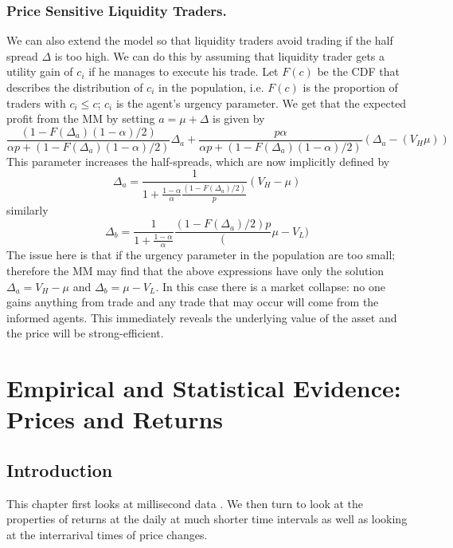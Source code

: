 \documentclass[11pt,a4paper]{article}
\theoremstyle{definition}
\theoremstyle{plain}
\theoremstyle{remark}
\newcommand{\1}{\mathbbm{1}}
\begin{document}
\subsubsection{Price Sensitive Liquidity Traders.} 
We can also extend the model so that liquidity traders avoid trading if the half spread $\Delta$ is too high. 
We can do this by assuming that liquidity trader gets a utility gain of $c_i$ if he manages to execute his trade. 
Let $F(c)$ be the CDF that describes the distribution of $c_i$ in the population, i.e. $F(c)$ is the proportion of 
traders with $c_i \le c$; $c_i$ is the agent's urgency parameter. 
We get that the expected profit from the MM by setting $a = \mu + \Delta$ is given by 
$$\frac{(1-F(\Delta_a) (1-\alpha)/2)}{\alpha p + (1-F(\Delta_a) (1-\alpha)/2)} \Delta_a + \frac{p \alpha}{\alpha p + (1-F(\Delta_a) (1-\alpha)/2)} (\Delta_a - (V_H \mu))$$
This parameter increases the half-spreads, which are now implicitly defined by
$$\Delta_a = \frac{1}{1 + \frac{1-\alpha}{\alpha } \frac{(1-F(\Delta_a)/2)}{p}} (V_H - \mu)$$
similarly 
$$\Delta_b = \frac{1}{1 + \frac{1-\alpha}{\alpha}} \frac{(1-F(\Delta_a)/2){p}} (\mu - V_L)$$
The issue here is that if the urgency parameter in the population are too small; therefore the MM 
may find that the above expressions have only the solution $\Delta_a = V_H - \mu$ and $\Delta_b = \mu - V_L$. 
In this case there is a market collapse: no one gains anything from trade and any trade that may occur will come from the 
informed agents. This immediately reveals the underlying value of the asset and the price will be strong-efficient. 

\section{Empirical and Statistical Evidence: Prices and Returns} 

\subsection{Introduction}
This chapter first looks at millisecond data . We then turn to look at the properties of 
returns at the daily at much shorter time intervals as well as looking at the interrarival 
times of price changes. 
\end{document}
